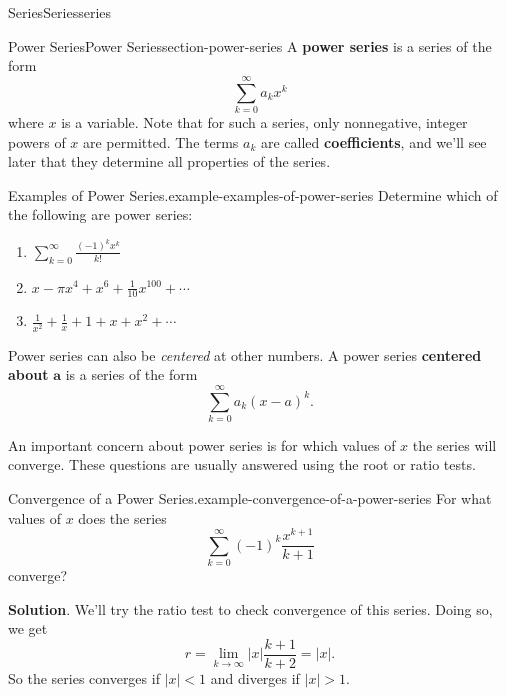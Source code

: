 \documentclass[oneside,10pt,]{book}
\newcommand{\terminology}[1]{\textbf{#1}}
\numberwithin{equation}{section}
\newcommand{\lt}{<}
\begin{document}
\begin{chapterptx}{Series}{}{Series}{}{}{series}
\begin{sectionptx}{Power Series}{}{Power Series}{}{}{section-power-series}
\hypertarget{p-930}{}%
A \terminology{power series} is a series of the form%
\begin{equation*}
\sum_{k=0}^{\infty}a_{k}x^{k}
\end{equation*}
where \(x\) is a variable. Note that for such a series, only nonnegative, integer powers of \(x\) are permitted. The terms \(a_{k}\) are called \terminology{coefficients}, and we'll see later that they determine all properties of the series.%
\begin{example}{Examples of Power Series.}{example-examples-of-power-series}%
\hypertarget{p-931}{}%
Determine which of the following are power series:\leavevmode%
\begin{enumerate}
\item\hypertarget{li-107}{}\(\sum_{k=0}^{\infty}\frac{(-1)^{k}x^{k}}{k!}\)%
\item\hypertarget{li-108}{}\(x - \pi x^{4} + x^{6} + \frac{1}{10}x^{100} + \cdots\)%
\item\hypertarget{li-109}{}\(\frac{1}{x^{2}} + \frac{1}{x} + 1 + x + x^{2} + \cdots\)%
\end{enumerate}
%
\end{example}
\hypertarget{p-932}{}%
Power series can also be \emph{centered} at other numbers. A power series \terminology{centered about} \(\mathbf{a}\) is a series of the form%
\begin{equation*}
\sum_{k=0}^{\infty}a_{k}(x - a)^{k}\text{.}
\end{equation*}
%
\par
\hypertarget{p-933}{}%
An important concern about power series is for which values of \(x\) the series will converge. These questions are usually answered using the root or ratio tests.%
\begin{example}{Convergence of a Power Series.}{example-convergence-of-a-power-series}%
\hypertarget{p-934}{}%
For what values of \(x\) does the series%
\begin{equation*}
\sum_{k=0}^{\infty}(-1)^{k}\frac{x^{k+1}}{k+1}
\end{equation*}
converge?%
\par\smallskip%
\noindent\textbf{Solution}.\hypertarget{solution-190}{}\quad%
\hypertarget{p-935}{}%
We'll try the ratio test to check convergence of this series. Doing so, we get%
\begin{equation*}
r = \lim_{k\to\infty}|x|\frac{k+1}{k+2} = |x|\text{.}
\end{equation*}
So the series converges if \(|x| \lt 1\) and diverges if \(|x| > 1\).%
\par

\end{example}
\end{sectionptx}
\end{chapterptx}
\end{document}
